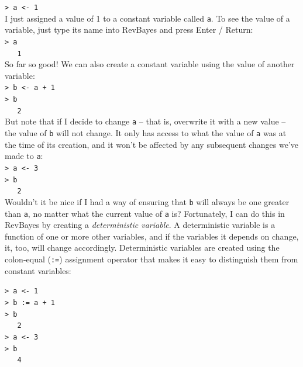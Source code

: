 \documentclass[12pt]{article}
\begin{document}
\indent \texttt{> a <- 1} \\

\noindent I just assigned a value of 1 to a constant variable called \texttt{a}. To see the value of a variable, just type its name into RevBayes and press Enter / Return: \\

\indent \texttt{> a} \\
\indent \texttt{\ \ \ 1} \\

\noindent So far so good! We can also create a constant variable using the value of another variable: \\

\indent \texttt{> b <- a + 1} \\
\indent \texttt{> b} \\
\indent \texttt{\ \ \ 2} \\

\noindent But note that if I decide to change \texttt{a} -- that is, overwrite it with a new value -- the value of \texttt{b} will not change. It only has access to what the value of \texttt{a} was at the time of its creation, and it won't be affected by any subsequent changes we've made to \texttt{a}: \\

\indent \texttt{> a <- 3} \\
\indent \texttt{> b} \\
\indent \texttt{\ \ \ 2} \\

\noindent Wouldn't it be nice if I had a way of ensuring that \texttt{b} will always be one greater than \texttt{a}, no matter what the current value of \texttt{a} is? Fortunately, I can do this in RevBayes by creating a \textit{deterministic variable}. A deterministic variable is a function of one or more other variables, and if the variables it depends on change, it, too, will change accordingly. Deterministic variables are created using the colon-equal (\texttt{:=}) assignment operator that makes it easy to distinguish them from constant variables:

\indent \texttt{> a <- 1} \\
\indent \texttt{> b := a + 1} \\
\indent \texttt{> b} \\
\indent \texttt{\ \ \ 2} \\
\indent \texttt{> a <- 3} \\
\indent \texttt{> b} \\
\indent \texttt{\ \ \ 4} \\
\end{document}
